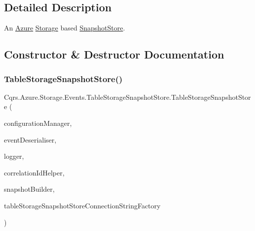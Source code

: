 \subsection{Detailed Description}
An \hyperlink{namespaceCqrs_1_1Azure}{Azure} \hyperlink{namespaceCqrs_1_1Azure_1_1Storage}{Storage} based \hyperlink{classCqrs_1_1Snapshots_1_1SnapshotStore_aa8ab186f864443c7d9647a4522864a84_aa8ab186f864443c7d9647a4522864a84}{Snapshot\+Store}. 



\subsection{Constructor \& Destructor Documentation}
\mbox{\label{classCqrs_1_1Azure_1_1Storage_1_1Events_1_1TableStorageSnapshotStore_a28cbff6169d91fe7646a1dc32b3cc7c2_a28cbff6169d91fe7646a1dc32b3cc7c2}} 
\subsubsection{\texorpdfstring{Table\+Storage\+Snapshot\+Store()}{TableStorageSnapshotStore()}}
{\footnotesize\ttfamily Cqrs.\+Azure.\+Storage.\+Events.\+Table\+Storage\+Snapshot\+Store.\+Table\+Storage\+Snapshot\+Store (\begin{DoxyParamCaption}\item[{\hyperlink{interfaceCqrs_1_1Configuration_1_1IConfigurationManager}{I\+Configuration\+Manager}}]{configuration\+Manager,  }\item[{\hyperlink{interfaceCqrs_1_1Events_1_1ISnapshotDeserialiser}{I\+Snapshot\+Deserialiser}}]{event\+Deserialiser,  }\item[{I\+Logger}]{logger,  }\item[{I\+Correlation\+Id\+Helper}]{correlation\+Id\+Helper,  }\item[{\hyperlink{interfaceCqrs_1_1Events_1_1ISnapshotBuilder}{I\+Snapshot\+Builder}}]{snapshot\+Builder,  }\item[{\hyperlink{interfaceCqrs_1_1Azure_1_1BlobStorage_1_1ITableStorageSnapshotStoreConnectionStringFactory}{I\+Table\+Storage\+Snapshot\+Store\+Connection\+String\+Factory}}]{table\+Storage\+Snapshot\+Store\+Connection\+String\+Factory }\end{DoxyParamCaption})}



